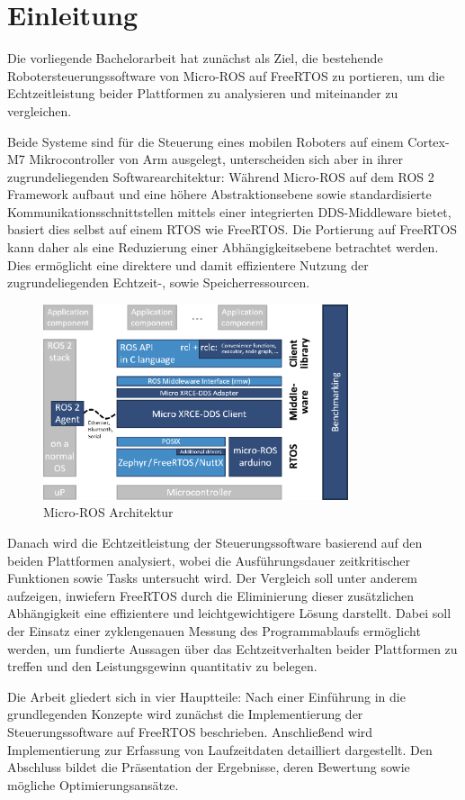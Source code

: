 \section*{Einleitung}

Die vorliegende Bachelorarbeit hat zunächst als Ziel, die bestehende
Robotersteuerungssoftware von Micro-ROS auf FreeRTOS zu portieren, um die
Echtzeitleistung beider Plattformen zu analysieren und miteinander zu
vergleichen.

Beide Systeme sind für die Steuerung eines mobilen Roboters auf einem Cortex-M7
Mikrocontroller von Arm ausgelegt, unterscheiden sich aber in ihrer
zugrundeliegenden Softwarearchitektur: Während Micro-ROS auf dem \ac{ROS 2}
Framework aufbaut und eine höhere Abstraktionsebene sowie standardisierte
Kommunikationsschnittstellen mittels einer integrierten \ac{DDS}-Middleware
bietet, basiert dies selbst auf einem \ac{RTOS} wie FreeRTOS. Die Portierung auf
FreeRTOS kann daher als eine Reduzierung einer Abhängigkeitsebene betrachtet
werden. Dies ermöglicht eine direktere und damit effizientere Nutzung der
zugrundeliegenden Echtzeit-, sowie Speicherressourcen.

\begin{figure}[htb] \centering
    \includegraphics[width=0.8\textwidth]{assets/Micro-ROS_architecture}
    \caption{Micro-ROS Architektur\cite[S. 6]{koubaa2023}}
\end{figure}

Danach wird die Echtzeitleistung der Steuerungssoftware basierend auf den beiden
Plattformen analysiert, wobei die Ausführungsdauer zeitkritischer Funktionen
sowie Tasks untersucht wird. Der Vergleich soll unter anderem aufzeigen,
inwiefern FreeRTOS durch die Eliminierung dieser zusätzlichen Abhängigkeit eine
effizientere und leichtgewichtigere Lösung darstellt. Dabei soll der Einsatz
einer zyklengenauen Messung des Programmablaufs ermöglicht werden, um fundierte
Aussagen über das Echtzeitverhalten beider Plattformen zu treffen und den
Leistungsgewinn quantitativ zu belegen.

Die Arbeit gliedert sich in vier Hauptteile: Nach einer Einführung in die
grundlegenden Konzepte wird zunächst die Implementierung der Steuerungssoftware
auf FreeRTOS beschrieben. Anschließend wird Implementierung zur Erfassung von
Laufzeitdaten detailliert dargestellt. Den Abschluss bildet die Präsentation der
Ergebnisse, deren Bewertung sowie mögliche Optimierungsansätze.
